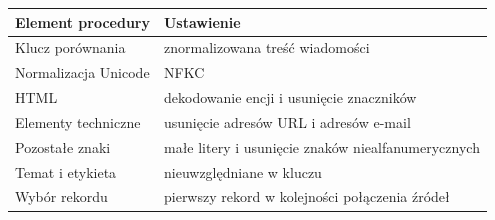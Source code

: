 \begin{tabular}{p{}p{}}
\hline
\textbf{Element procedury} & \textbf{Ustawienie} \\
\hline
Klucz porównania & znormalizowana treść wiadomości \\
Normalizacja Unicode & NFKC \\
HTML & dekodowanie encji i usunięcie znaczników \\
Elementy techniczne & usunięcie adresów URL i adresów e-mail \\
Pozostałe znaki & małe litery i usunięcie znaków niealfanumerycznych \\
Temat i etykieta & nieuwzględniane w kluczu \\
Wybór rekordu & pierwszy rekord w kolejności połączenia źródeł \\
\hline
\end{tabular}
